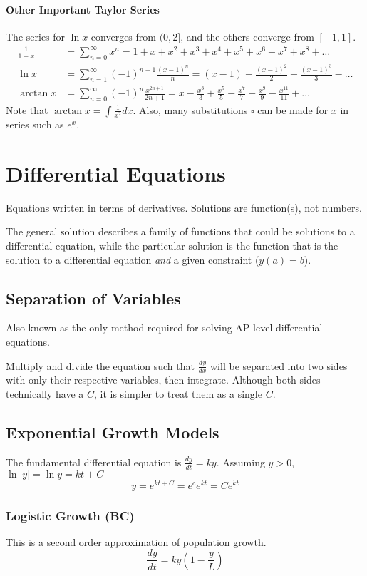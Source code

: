 \documentclass{article}
\begin{document}
\paragraph{Other Important Taylor Series}
The series for $\ln{x}$ converges from $(0,2]$, and the others converge from $[-1,1]$.
\begin{align*}
    \frac{1}{1-x}&=\sum_{n=0}^\infty x^n=1+x+x^2+x^3+x^4+x^5+x^6+x^7+x^8+\ldots\\
    \ln{x}&=\sum_{n=1}^\infty (-1)^{n-1}\frac{(x-1)^n}{n}=\left(x-1\right)-\frac{\left(x-1\right)^2}{2}+\frac{\left(x-1\right)^3}{3}-\ldots\\
    \arctan{x}&=\sum_{n=0}^\infty (-1)^{n}\frac{x^{2n+1}}{2n+1}=x-\frac{x^3}{3}+\frac{x^5}{5}-\frac{x^7}{7}+\frac{x^9}{9}-\frac{x^{11}}{11}+\ldots
\end{align*}
Note that $\arctan{x}=\int \frac{1}{x^2}dx$. Also, many substitutions $\square$ can be made for $x$ in series such as $e^x$.

\section{Differential Equations}
Equations written in terms of derivatives. Solutions are function(s), not numbers.

The general solution describes a family of functions that could be solutions to a differential equation, while the particular solution is the function that is the solution to a differential equation \emph{and} a given constraint ($y(a)=b$).

\subsection{Separation of Variables}
Also known as the only method required for solving AP-level differential equations.

Multiply and divide the equation such that $\frac{dy}{dx}$ will be separated into two sides with only their respective variables, then integrate. Although both sides technically have a $C$, it is simpler to treat them as a single $C$.

\subsection{Exponential Growth Models}
The fundamental differential equation is $\frac{dy}{dt}=ky$.
Assuming $y>0$, $\ln{|y|}=\ln{y}=kt+C$
$$y=e^{kt+C}=e^ce^{kt}=Ce^{kt}$$

\subsubsection{Logistic Growth (BC)}
This is a second order approximation of population growth.
$$\frac{dy}{dt}=ky\left(1-\frac{y}{L}\right)$$
\end{document}
